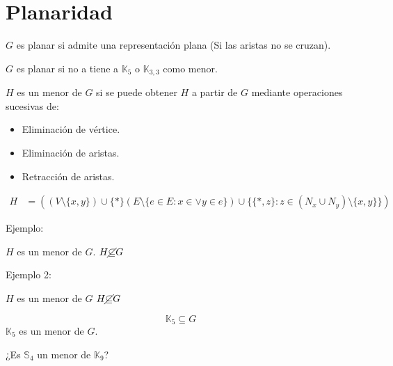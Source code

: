 \documentclass[../main.tex]{subfiles}
\begin{document}
\chapter{Planaridad}%

\thispagestyle{fancy}

$G$ es planar si admite una representación plana (Si las aristas no se cruzan).

\teorema
$G$ es planar si no a tiene a $\mathbb{K}_5$ o $\mathbb{K}_{3,3}$ como menor.

$H$ es un menor de $G$ si se puede obtener $H$ a partir de $G$ mediante
operaciones sucesivas de:
\begin{itemize}
	\item Eliminación de vértice.
	\item Eliminación de aristas.
	\item Retracción de aristas.
\end{itemize}

\begin{figure}[H]
	\centering
	
\end{figure}

\begin{align*}
	H &= ((V\setminus \{x,y\})\cup \{*\}
	(E\setminus\{e\in E:x\in\vee y \in e\}) \cup
	\{\{*,z\}:z\in(N_x\cup N_y)\setminus\{x,y\}\})
\end{align*}

Ejemplo:

\begin{figure}[H]
	\centering
	
\end{figure}

$H$ es un menor de $G$. $H\cancel{\subseteq} G$

Ejemplo 2:

\begin{figure}[H]
	\centering
	
\end{figure}

$H$ es un menor de $G$ $H \cancel{\subseteq} G$

\begin{figure}[H]
	\boldmath
	\centering
	
\end{figure}

\[
	\mathbb{K}_5 \subseteq G
\]
$\mathbb{K}_5$ es un menor de $G$.

¿Es $\mathbb{S}_4$ un menor de $\mathbb{K}_9$?
\end{document}
